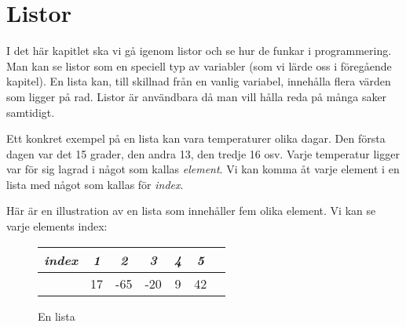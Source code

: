 %
%

\chapter{Listor}\label{ch:listor}I det här kapitlet ska vi gå igenom listor och se hur de funkar i programmering. Man kan se listor som en speciell typ av variabler (som vi lärde oss i föregående kapitel). En lista kan, till skillnad från en vanlig variabel, innehålla flera värden som ligger på rad. Listor är användbara då man vill hålla reda på många saker samtidigt.


Ett konkret exempel på en lista kan vara temperaturer olika dagar. Den första dagen var det 15 grader, den andra 13, den tredje 16 osv. Varje temperatur ligger var för sig lagrad i något som kallas \emph{element}. Vi kan komma åt varje element i en lista med något som kallas för \emph{index}.

Här är en illustration av en lista som innehåller fem olika element. Vi kan se varje elements index:

\begin{figure}[H]
\begin{center}
\caption{En lista}
\begin{tabular}{l|*{5}{c}r}
\emph{index} & \emph{1} & \emph{2} & \emph{3} & \emph{4} & \emph{5} \\
\hline
\emph{}       & 17 & -65 & -20 & 9 & 42  \\
\end{tabular}
\end{center}
\end{figure}

